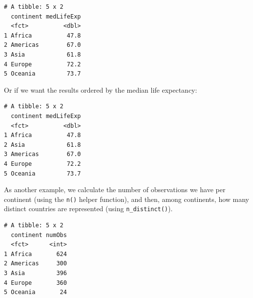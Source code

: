 \documentclass[]{krantz}
\makeatletter
\newenvironment{Shaded}{\begin{snugshade}}{\end{snugshade}}
\newcommand{\DataTypeTok}[1]{\textcolor[rgb]{0.27,0.27,0.27}{#1}}
\newcommand{\KeywordTok}[1]{\textcolor[rgb]{0.27,0.27,0.27}{\textbf{#1}}}
\newcommand{\NormalTok}[1]{#1}
\newcommand{\OperatorTok}[1]{\textcolor[rgb]{0.43,0.43,0.43}{\textbf{#1}}}
\newcommand{\StringTok}[1]{\textcolor[rgb]{0.5,0.5,0.5}{#1}}
\newenvironment{kframe}{%
\medskip{}
\setlength{\fboxsep}{.8em}
 \def\at@end@of@kframe{}%
 \ifinner\ifhmode%
  \def\at@end@of@kframe{\end{minipage}}%
  \begin{minipage}{\columnwidth}%
 \fi\fi%
 \def\FrameCommand##1{\hskip\@totalleftmargin \hskip-\fboxsep
 \colorbox{shadecolor}{##1}\hskip-\fboxsep
     \hskip-\linewidth \hskip-\@totalleftmargin \hskip\columnwidth}%
 \MakeFramed {\advance\hsize-\width
   \@totalleftmargin\z@ \linewidth\hsize
   \@setminipage}}%
 {\par\unskip\endMakeFramed%
 \at@end@of@kframe}
\renewenvironment{Shaded}{\begin{kframe}}{\end{kframe}}
\makeatother
\begin{document}
\begin{verbatim}
# A tibble: 5 x 2
  continent medLifeExp
  <fct>          <dbl>
1 Africa          47.8
2 Americas        67.0
3 Asia            61.8
4 Europe          72.2
5 Oceania         73.7
\end{verbatim}

Or if we want the results ordered by the median life expectancy:

\begin{Shaded}
\end{Shaded}

\begin{verbatim}
# A tibble: 5 x 2
  continent medLifeExp
  <fct>          <dbl>
1 Africa          47.8
2 Asia            61.8
3 Americas        67.0
4 Europe          72.2
5 Oceania         73.7
\end{verbatim}

As another example, we calculate the number of observations we have per continent (using the \texttt{n()} helper function), and then, among continents, how many distinct countries are represented (using \texttt{n\_distinct()}).

\begin{Shaded}
\end{Shaded}

\begin{verbatim}
# A tibble: 5 x 2
  continent numObs
  <fct>      <int>
1 Africa       624
2 Americas     300
3 Asia         396
4 Europe       360
5 Oceania       24
\end{verbatim}
\end{document}
